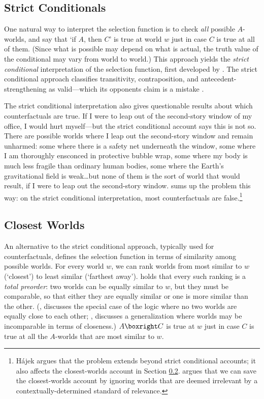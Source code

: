 \subsection{Strict Conditionals}
\label{strict}

One natural way to interpret the selection function is to check \emph{all} possible $A$-worlds, and say that `if $A$, then $C$' is true at world $w$ just in case $C$ is true at all of them.  (Since what is possible may depend on what is actual, the truth value of the conditional may vary from world to world.)  This approach yields the \emph{strict conditional} interpretation of the selection function, first developed by \citet{lewis-survey}.  The strict conditional approach classifies transitivity, contraposition, and antecedent-strengthening as valid---which its opponents claim is a mistake \citep[see][4--12]{lewis-counterfactuals}.

The strict conditional interpretation also gives questionable results about which counterfactuals are true.  If I were to leap out of the second-story window of my office, I would hurt myself---but the strict conditional account says this is not so.  There are possible worlds where I leap out the second-story window and remain unharmed: some where there is a safety net underneath the window, some where I am thoroughly ensconced in protective bubble wrap, some where my body is much less fragile than ordinary human bodies, some where the Earth's gravitational field is weak\ldots but none of them is the sort of world that would result, if I were to leap out the second-story window.  \citet{HajekManuscript-HJEMCA} sums up the problem this way: on the strict conditional interpretation, most counterfactuals are false.\footnote{H\'{a}jek argues that the problem extends beyond strict conditional accounts; it also affects the closest-worlds account in Section \ref{closest}.  \citet{Lewis2015-LEWEC} argues that we can save the closest-worlds account by ignoring worlds that are deemed irrelevant by a contextually-determined standard of relevance.}

\subsection{Closest Worlds}
\label{closest}

An alternative to the strict conditional approach, typically used for counterfactuals, defines the selection function in terms of similarity among possible worlds.  For every world $w$, we can rank worlds from most similar to $w$ (`closest') to least similar (`farthest away').  \citet{lewis-counterfactuals} holds that every such ranking is a \emph{total preorder}: two worlds can be equally similar to $w$, but they must be comparable, so that either they are equally similar or one is more similar than the other.  (\citealp{stalnaker:conditionals}, discusses the special case of the logic where no two worlds are equally close to each other; \citealp{Pollock1976-POLTPW}, discusses a generalization where worlds may be incomparable in terms of closeness.)  $A \boxright C$ is true at $w$ just in case $C$ is true at all the $A$-worlds that are most similar to $w$.

